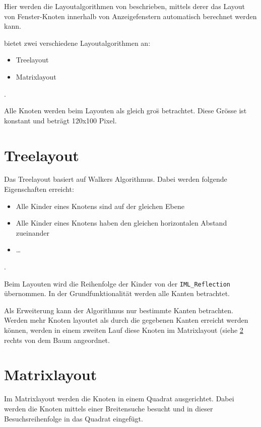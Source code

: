 %
%
%

Hier werden die Layoutalgorithmen von \product beschrieben, mittels
derer das Layout von Fenster-Knoten innerhalb von Anzeigefenstern
automatisch berechnet werden kann.

\product bietet zwei verschiedene Layoutalgorithmen an:
\begin{itemize}
  \item Treelayout
  \item Matrixlayout
\end{itemize}.

Alle Knoten werden beim Layouten als gleich gro\"s betrachtet. Diese Gr\"osse ist konstant und betr\"agt 120x100 Pixel.

\section{Treelayout}
Das Treelayout basiert auf Walkers Algorithmus. Dabei werden folgende Eigenschaften erreicht:
\begin{itemize}
   \item Alle Kinder eines Knotens sind auf der gleichen Ebene
   \item Alle Kinder eines Knotens haben den gleichen horizontalen Abstand zueinander
   \item \ldots
\end{itemize}.

Beim Layouten wird die Reihenfolge der Kinder von der \verb$IML_Reflection$ \"ubernommen. In der Grundfunktionalit\"at werden alle Kanten betrachtet. 

Als Erweiterung kann der Algorithmus nur bestimmte Kanten betrachten.
Werden mehr Knoten layoutet als durch die gegebenen Kanten erreicht werden k\"onnen, werden in einem zweiten Lauf diese Knoten im Matrixlayout (siehe \ref{Matrixlayout} rechts von dem Baum angeordnet.

\section{Matrixlayout}
\label{Matrixlayout}
Im Matrixlayout werden die Knoten in einem Quadrat ausgerichtet.
Dabei werden die Knoten mittels einer Breitensuche besucht und in dieser Besuchsreihenfolge in das Quadrat eingef\"ugt.


